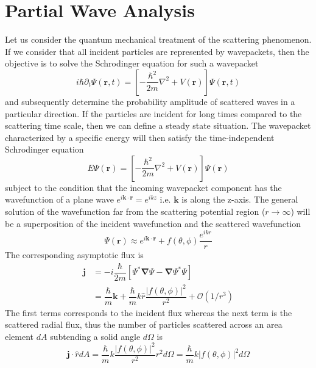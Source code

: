 \documentclass[aps,prb,onecolumn,notitlepage,showpacs,floatfix,superscriptaddress]{revtex4-1}
\begin{document}
\section{Partial Wave Analysis}
Let us consider the quantum mechanical treatment of the scattering phenomenon. If we consider that all incident particles are represented by wavepackets, then the objective is to solve the Schrodinger equation for such a wavepacket
\begin{equation}
i\hbar \partial_t \Psi({\bm r},t) = \left[-\dfrac{\hbar^2}{2m} \nabla^2 + V({\bm r}) \right] \Psi({\bm r},t)
\end{equation}
and subsequently determine the probability amplitude of scattered waves in a particular direction. If the particles are incident for long times compared to the scattering time scale, then we can define a steady state situation. The wavepacket characterized by a specific energy will then satisfy the time-independent Schrodinger equation
\begin{equation}
E  \Psi({\bm r}) = \left[-\dfrac{\hbar^2}{2m} \nabla^2 + V({\bm r}) \right] \Psi({\bm r})
\end{equation}
subject to the condition that the incoming wavepacket component has the wavefunction of a plane wave $e^{i {\bm k}\cdot {\bm r}}=e^{ikz}$ i.e. $\bm k$ is along the z-axis. The general solution of the wavefunction far from the scattering potential region ($r \rightarrow \infty$) will be a superposition of the incident wavefunction and the scattered wavefunction
\begin{equation}
\Psi({\bm r}) \approx e^{i {\bm k}\cdot {\bm r}} + f(\theta,\phi) \dfrac{e^{ikr}}{r}
\end{equation}
The corresponding asymptotic flux is
\begin{equation}
\begin{split}
{\bm j} &= -i \dfrac{\hbar}{2m} \left[\Psi^* {\bm \nabla} \Psi - {\bm \nabla} \Psi^* \Psi \right] \\
&=\dfrac{\hbar}{m} {\bm k} + \dfrac{\hbar}{m} k \hat{r} \dfrac{\vert f(\theta,\phi)\vert^2}{r^2} + \mathcal{O}(1/r^3)
\end{split}
\end{equation}
The first terms corresponds to the incident flux whereas the next term is the scattered radial flux, thus the number of particles scattered across an area element $dA$ subtending a solid angle $d\Omega$ is
\begin{equation}
{\bm j}  \cdot \hat{r} dA = \dfrac{\hbar}{m} k  \dfrac{\vert f(\theta,\phi)\vert^2}{r^2}  r^2 d\Omega = \dfrac{\hbar}{m} k  \vert f(\theta,\phi)\vert^2 d\Omega
\end{equation}
\end{document}
